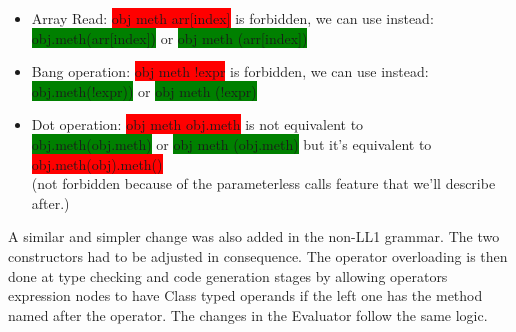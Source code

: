 \begin{itemize}
\item{Array Read: \colorbox{red}{obj meth arr[index]} is forbidden, we can use instead:\\
    \colorbox{green}{obj.meth(arr[index])} or \colorbox{green}{obj meth
      (arr[index])}}
\item{Bang operation: \colorbox{red}{obj meth !expr} is forbidden, we can use instead:\\
    \colorbox{green}{obj.meth(!expr))} or \colorbox{green}{obj meth (!expr)}}
\item{Dot operation: \colorbox{red}{obj meth obj.meth} is not equivalent to\\
    \colorbox{green}{obj.meth(obj.meth)} or \colorbox{green}{obj meth
      (obj.meth)} but it's equivalent to \colorbox{red}{obj.meth(obj).meth()} \\
    (not forbidden because of the parameterless calls feature that
    we'll describe after.)}
\end{itemize}
\textnormal{A similar and simpler change was also added in the non-LL1 grammar.
  The two constructors had to be adjusted in consequence.}
\textnormal{The operator overloading is then done at type checking and code
  generation stages by allowing operators expression nodes to have Class typed
  operands if the left one has the method named after the operator. The changes
  in the Evaluator follow the same logic. }
